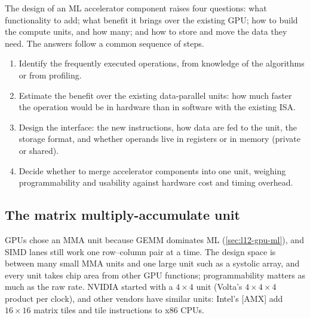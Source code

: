 \documentclass[../main.tex]{subfiles}
\begin{document}
The design of an ML accelerator component raises four questions: what
functionality to add; what benefit it brings over the existing GPU;
how to build the compute units, and how many; and how to store and move
the data they need.  The answers follow a common sequence of steps.
\begin{enumerate}
  \item Identify the frequently executed operations, from knowledge of
    the algorithms or from profiling.
  \item Estimate the benefit over the existing data-parallel units:
    how much faster the operation would be in hardware than in
    software with the existing ISA.
  \item Design the interface: the new instructions, how data are fed to
    the unit, the storage format, and whether operands live in registers
    or in memory (private or shared).
  \item Decide whether to merge accelerator components into one unit,
    weighing programmability and usability against hardware cost and
    timing overhead.
\end{enumerate}

\subsection{The matrix multiply-accumulate unit}

GPUs chose an MMA unit because GEMM dominates ML
(\cref{sec:l12-gpu-ml}), and SIMD lanes still work one row--column pair
at a time.  The design space is between many small MMA units and one
large unit such as a systolic array, and every unit takes chip area
from other GPU functions; programmability matters as much as the raw
rate.  NVIDIA started with a $4 \times 4$ unit (Volta's
$4 \times 4 \times 4$ product per clock), and other vendors have
similar units: Intel's [AMX]
add $16 \times 16$ matrix tiles and tile instructions to x86
CPUs.
\end{document}
